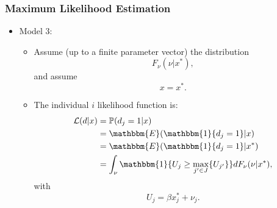 \documentclass[10pt,letterpaper]{beamer}
\begin{document}
\begin{frame}
\frametitle{Maximum Likelihood Estimation}

\begin{itemize}
	\item Model 3:
	\begin{itemize}
		\item Assume (up to a finite parameter vector) the distribution
		\begin{equation*}
		F_{\nu}(\nu|x^{*}),
		\end{equation*}
		and assume
		\begin{equation*}
		x = x^{*}.
		\end{equation*}
		\item The individual $i$ likelihood function is:
		\begin{equation*}
		\begin{split}
		\mathcal{L}(d|x)&=\mathbb{P}(d_{j}=1|x)\\
		&=\mathbbm{E}(\mathbbm{1}\{d_{j}=1\}|x)\\
		&=\mathbbm{E}(\mathbbm{1}\{d_{j}=1\}|x^{*})\\
		&=\int_{\nu}\mathbbm{1}\{U_{j}\geq\max_{j'\in J}\{U_{j'}\}\}dF_{\nu}(\nu|x^{*}),\\
		\end{split}
		\end{equation*}
		with
		\begin{equation*}
		U_{j}=\beta x^{*}_{j}+\nu_{j}.
		\end{equation*}
	\end{itemize}
\end{itemize}
\end{frame}
\end{document}
